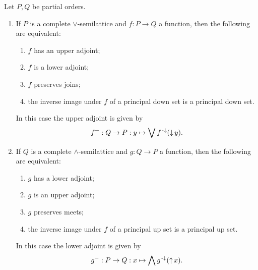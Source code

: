 \begin{proposition} \label{GaloisConnectionLatticePreservation}
Let $P, Q$ be partial orders.
\begin{enumerate}
\item If $P$ is a complete $\vee$-semilattice and $f: P\to Q$ a function, then the following are equivalent:
\begin{enumerate}
\item $f$ has an upper adjoint;
\item $f$ is a lower adjoint;
\item $f$ preserves joins;
\item the inverse image under $f$ of a principal down set is a principal down set.
\end{enumerate}
In this case the upper adjoint is given by
\[ f^+: Q\to P: y\mapsto \bigvee f^{{\text{\hspace{0.15em}-}\downarrow}}(\operatorname{\downarrow} y). \]
\item If $Q$ is a complete $\wedge$-semilattice and $g: Q\to P$ a function, then the following are equivalent:
\begin{enumerate}
\item $g$ has a lower adjoint;
\item $g$ is an upper adjoint;
\item $g$ preserves meets;
\item the inverse image under $f$ of a principal up set is a principal up set.
\end{enumerate}
In this case the lower adjoint is given by
\[ g^-: P\to Q: x\mapsto \bigwedge g^{{\text{\hspace{0.15em}-}\downarrow}}(\operatorname{\uparrow} x). \]
\end{enumerate}
\end{proposition}
